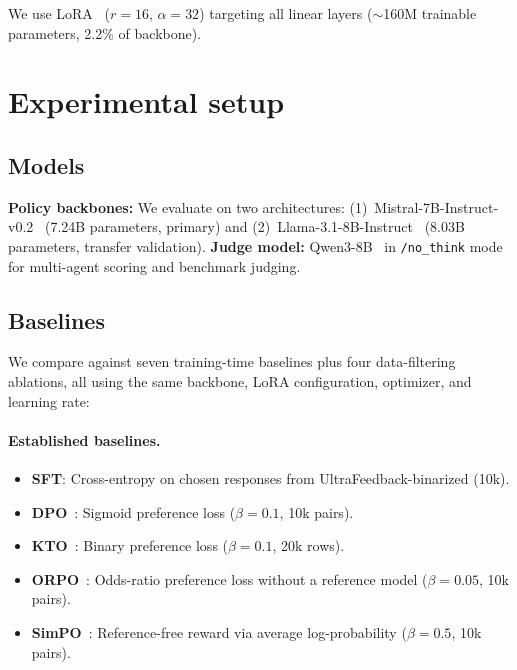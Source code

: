 \documentclass{article}
\begin{document}
We use LoRA~\citep{hu2022lora} ($r{=}16$, $\alpha{=}32$) targeting all linear layers ($\sim$160M trainable parameters, 2.2\% of backbone).


\section{Experimental setup}
\label{sec:experiments}

\subsection{Models}

\textbf{Policy backbones:} We evaluate on two architectures: (1)~Mistral-7B-Instruct-v0.2~\citep{jiang2023mistral} (7.24B parameters, primary) and (2)~Llama-3.1-8B-Instruct~\citep{grattafiori2024llama3} (8.03B parameters, transfer validation).
\textbf{Judge model:} Qwen3-8B~\citep{qwen2025qwen3} in \texttt{/no\_think} mode for multi-agent scoring and benchmark judging.

\subsection{Baselines}

We compare against seven training-time baselines plus four data-filtering ablations, all using the same backbone, LoRA configuration, optimizer, and learning rate:

\paragraph{Established baselines.}
\begin{itemize}[nosep,leftmargin=*]
    \item \textbf{SFT}: Cross-entropy on chosen responses from UltraFeedback-binarized (10k).
    \item \textbf{DPO}~\citep{rafailov2023dpo}: Sigmoid preference loss ($\beta{=}0.1$, 10k pairs).
    \item \textbf{KTO}~\citep{ethayarajh2024kto}: Binary preference loss ($\beta{=}0.1$, 20k rows).
    \item \textbf{ORPO}~\citep{hong2024orpo}: Odds-ratio preference loss without a reference model ($\beta{=}0.05$, 10k pairs).
    \item \textbf{SimPO}~\citep{meng2024simpo}: Reference-free reward via average log-probability ($\beta{=}0.5$, 10k pairs).
\end{itemize}
\end{document}
